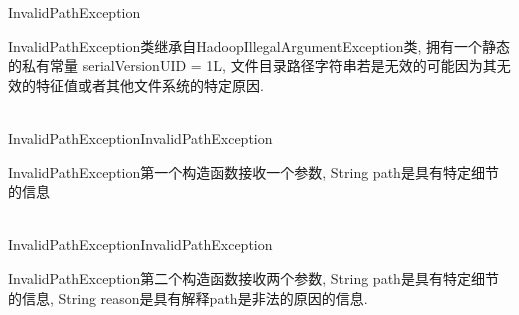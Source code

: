 \begin{XeClass}{InvalidPathException}
   
 InvalidPathException类继承自HadoopIllegalArgumentException类,
 拥有一个静态的私有常量 serialVersionUID = 1L,
 文件目录路径字符串若是无效的可能因为其无效的特征值或者其他文件系统的特定原因.

  \begin{XeMethod}{\XePublic\\ }{InvalidPathException}{InvalidPathException}
       
 InvalidPathException第一个构造函数接收一个参数,
 String path是具有特定细节的信息

  \end{XeMethod}

  \begin{XeMethod}{\XePublic\\ }{InvalidPathException}{InvalidPathException}
       
 InvalidPathException第二个构造函数接收两个参数,
 String path是具有特定细节的信息,
 String reason是具有解释path是非法的原因的信息.

  \end{XeMethod}

\end{XeClass}
